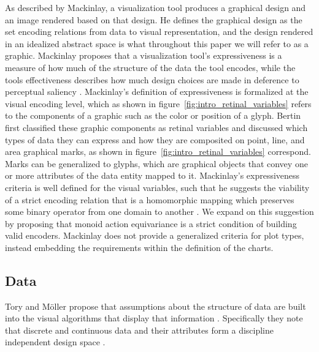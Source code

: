\documentclass[../main.tex]{subfiles}
\begin{document}
As described by Mackinlay, a visualization tool produces a graphical design and an image rendered based on that design. He defines the graphical design as the set encoding relations from data to visual representation\cite{mackinlayAutomatingDesignGraphical1986}, and the design rendered in an idealized abstract space is what throughout this paper we will refer to as a graphic. Mackinlay  proposes that a visualization tool's expressiveness is a measure of how much of the structure of the data the tool encodes, while the tools effectiveness describes how much design choices are made in deference to perceptual saliency \cite{clevelandResearchStatisticalGraphics1987,clevelandGraphicalPerceptionTheory1984,chambersGraphicalMethodsData1983a, munznerVisualizationAnalysisDesign2014}. Mackinlay's definition of expressiveness is formalized at the visual encoding level, which as shown in figure~\ref{fig:intro_retinal_variables} refers to the components of a graphic such as the color or position of a glyph. Bertin first classified these graphic components as retinal variables and discussed which types of data they can express \cite{bertinIIPropertiesGraphic2011} and how they are composited on point, line, and area graphical marks, as shown in figure~\ref{fig:intro_retinal_variables} correspond. Marks can be generalized to glyphs, which are graphical objects that convey one or more attributes of the data entity mapped to it\cite{ware2019information}. Mackinlay's expressiveness criteria is well defined for the visual variables, such that he suggests the viability of a strict encoding relation that is a homomorphic mapping which preserves some binary operator from one domain to another \cite{mackinlayAUTOMATICDESIGNGRAPHICAL1987}. We expand on this suggestion by proposing that monoid action equivariance is a strict condition of building valid encoders. Mackinlay does not provide a generalized criteria for plot types, instead embedding the requirements within the definition of the charts. 


\subsection{Data}
\label{sec:intro_data}
Tory and Möller propose that assumptions about the structure of data are built into the visual algorithms that display that information \cite{toryRethinkingVisualizationHighLevel2004}. Specifically they note that discrete and continuous data and their attributes form a discipline independent design space \cite{pousmanCasualInformation2007}. 
\end{document}
